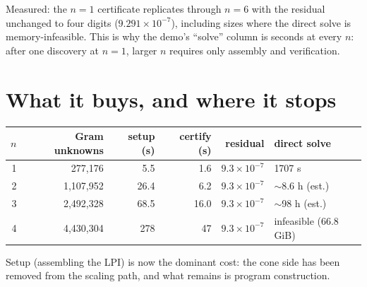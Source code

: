 \documentclass[11pt]{article}
\begin{document}
Measured: the $n=1$ certificate replicates through $n=6$ with the residual
unchanged to four digits ($9.291\times10^{-7}$), including sizes where the
direct solve is memory-infeasible. This is why the demo's ``solve'' column is
seconds at every $n$: after one discovery at $n=1$, larger $n$ requires only
assembly and verification.

\section{What it buys, and where it stops}

\begin{center}
\begin{tabular}{@{}rrrrrl@{}}
\toprule
$n$ & Gram unknowns & setup (s) & certify (s) & residual & direct solve\\
\midrule
1 & 277{,}176   & 5.5  & 1.6  & $9.3\times10^{-7}$ & 1707 s\\
2 & 1{,}107{,}952 & 26.4 & 6.2  & $9.3\times10^{-7}$ & $\sim$8.6 h (est.)\\
3 & 2{,}492{,}328 & 68.5 & 16.0 & $9.3\times10^{-7}$ & $\sim$98 h (est.)\\
4 & 4{,}430{,}304 & 278  & 47   & $9.3\times10^{-7}$ & infeasible (66.8 GiB)\\
\bottomrule
\end{tabular}
\end{center}

\noindent
Setup (assembling the LPI) is now the dominant cost: the cone side has been
removed from the scaling path, and what remains is program construction.
\end{document}
